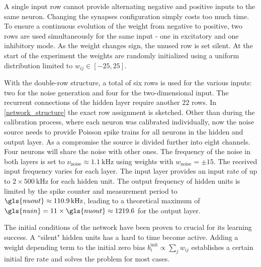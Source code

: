 A single input row cannot provide alternating negative and positive inputs to the same neuron. Changing the synapses configuration simply costs too much time. To ensure a continuous evolution of the weight from negative to positive, two rows are used simultaneously for the same input - one in excitatory and one inhibitory mode. As the weight changes sign, the unused row is set silent. At the start of the experiment the weights are randomly initialized using a uniform distribution limited to $w_{ij} \in [-25, 25]$.


With the double-row structure, a total of six rows is used for the various inputs: two for the noise generation and four for the two-dimensional input. The recurrent connections of the hidden layer require another $22$ rows. In \cref{network_structure} the exact row assignment is sketched. Other than during the calibration process, where each neuron was calibrated individually, now the noise source needs to provide Poisson spike trains for all neurons in the hidden and output layer. As a compromise the source is divided further into eight channels. Four neurons will share the noise with other ones. The frequency of the noise in both layers is set to $\nu_\text{noise} \approx \SI{1.1}{\kilo \Hz}$ using weights with $w_\text{noise} = \pm 15$. The received input frequency varies for each layer. The input layer provides an input rate of up to $2 \times \SI{500}{\kilo \Hz}$ for each hidden unit. The output frequency of hidden units is limited by the spike counter and measurement period to $\gls{nuout} \approx \SI{110.9}{\kilo \Hz}$, leading to a theoretical maximum of $\gls{nuin}
= 11 \times \gls{nuout} \approx 1219.6$ for the output layer. 

The initial conditions of the network have been proven to crucial for its learning success. A ``silent" hidden units has a hard to time become active. Adding a weight depending term to the initial zero bias $b_i^\text{init} \propto \sum_j w_{ij}$ establishes a certain initial fire rate and solves the problem for most cases.


